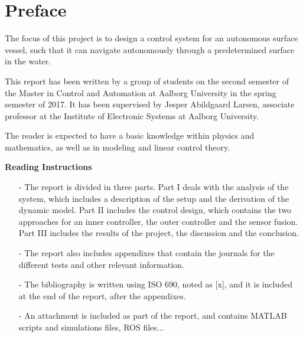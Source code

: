 \chapter*{Preface}
\vspace{-12 pt}
The focus of this project is to design a control system for an autonomous surface vessel, such that it can navigate autonomously through a predetermined surface in the water.

This report has been written by a group of students on the second semester of the Master in Control and Automation at Aalborg University in the spring semester of 2017. It has been supervised by Jesper Abildgaard Larsen, associate professor at the Institute of Electronic Systems at Aalborg University.

The reader is expected to have a basic knowledge within physics and mathematics, as well as in modeling and linear control theory.

\textbf{Reading Instructions}
\vspace{-10 pt}
\begin{itemize}
    \item[-] The report is divided in three parts. Part I deals with the analysis of the system, which includes a description of the setup and the derivation of the dynamic model. Part II includes the control design, which contains the two approaches for an inner controller, the outer controller and the sensor fusion. Part III includes the results of the project, the discussion and the conclusion.
    \item[-] The report also includes appendixes that contain the journals for the different tests and other relevant information.
    \item[-] The bibliography is written using ISO 690, noted as [x], and it is included at the end of the report, after the appendixes.
    \item[-] An attachment is included as part of the report, and contains MATLAB scripts and simulations files, ROS files... 
\end{itemize}

